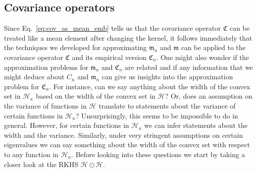 \documentclass[10pt]{amsart}
\theoremstyle{definition}\newtheorem{defi}[theo]{Definition}\newtheorem{rema}[theo]{Remark}\newtheorem{exam}[theo]{Example}\newtheorem{exem}[theo]{Example}\newtheorem{nota}[theo]{Notation}
\theoremstyle{remark}
\newcommand{\cH}{\mathcal{H}}
\newcommand{\fkC}{\mathfrak{C}}
\newcommand{\mean}{\mathfrak{m}}
\begin{document}
\subsection{Covariance operators} \label{sec:cov_op_approx}
Since Eq.~\eqref{eq:cov_as_mean_emb} tells us that the covariance operator $\fkC$ can be treated like a mean element after changing the kernel, it follows immediately that the techniques we developed for approximating $\mean_n$ and $\mean$ can be applied to the covariance operator $\fkC$ and its empirical version $\fkC_n$. One might also wonder if the approximation problems for $\mean_n$ and $\fkC_n$ are related and if any information that we might deduce about $C_n$ and $\mean_n$ can give us insights into the approximation problem for $\fkC_n$. For instance, can we say anything about the width of the convex set in $\cH_\kappa$ based on the width of the convex set in $\cH$? Or, does an assumption on the variance of functions in $\cH$ translate to statements about the variance of certain functions in $\cH_\kappa$? Unsurprisingly, this seems to be impossible to do in general. However, for certain functions in $\cH_\kappa$ we can infer statements about the width and the variance. Similarly, under very stringent assumptions on certain eigenvalues we can say something about the width of the convex set with respect to any function in $\cH_\kappa$. Before looking into these questions we start by taking a closer look at the RKHS $\cH \odot \cH$.
\end{document}

